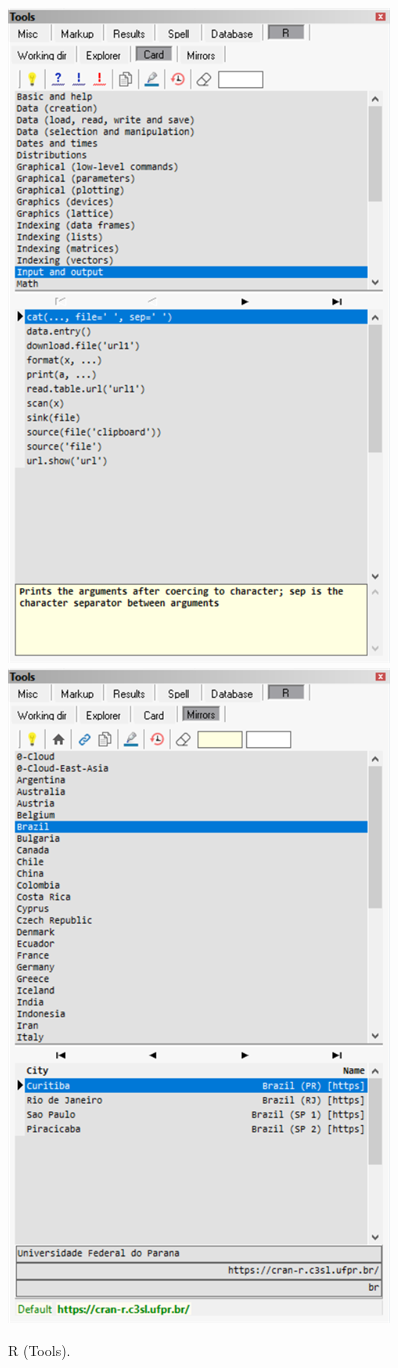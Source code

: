 \begin{figure}[H]
  \includegraphics[scale=0.35]{./res/tools_r_card.png}~~
  \includegraphics[scale=0.35]{./res/tools_r_mirrors.png}\\
  \caption{R (Tools).}
  \label{fig:tools_r}
\end{figure}
